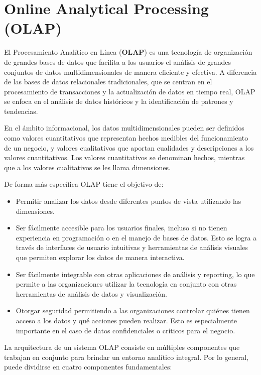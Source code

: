 \section{Online Analytical Processing (OLAP)} \label{section:olap}

El Procesamiento Anal\'itico en L\'inea (\textbf{OLAP}) es una tecnología de organización de grandes bases de datos 
que facilita a los usuarios el an\'alisis de grandes conjuntos de datos multidimensionales de manera 
eficiente y efectiva. A diferencia de las bases de datos relacionales tradicionales, que se centran en el procesamiento 
de transacciones y la actualización de datos en tiempo real, OLAP se enfoca en el análisis de datos históricos y la 
identificación de patrones y tendencias\cite{chaudhuri1997overview}.

En el ámbito informacional, los datos multidimensionales pueden ser definidos como valores cuantitativos que representan hechos medibles del 
funcionamiento de un negocio, y valores cualitativos que aportan cualidades y descripciones a los valores cuantitativos. Los valores cuantitativos 
se denominan hechos, mientras que a los valores cualitativos se les llama dimensiones\cite{lismaster}.

De forma m\'as espec\'ifica OLAP tiene el objetivo de: 

\begin{itemize}
    \item Permitir analizar los datos desde 
        diferentes puntos de vista utilizando las dimensiones.
    \item Ser fácilmente accesible para los usuarios finales, incluso si no tienen experiencia en programación o en el 
        manejo de bases de datos. Esto se logra a través de interfaces de usuario intuitivas y herramientas de análisis 
        visuales que permiten explorar los datos de manera interactiva.
    \item Ser f\'acilmente integrable con otras aplicaciones de análisis y reporting, lo que permite a las organizaciones 
        utilizar la tecnología en conjunto con otras herramientas de análisis de datos y visualización.
    \item Otorgar seguridad permitiendo a las organizaciones controlar quiénes tienen acceso a los datos y qué acciones 
        pueden realizar. Esto es especialmente importante en el caso de datos confidenciales o críticos para el negocio.
\end{itemize}

La arquitectura de un sistema OLAP consiste en múltiples componentes que trabajan en conjunto para brindar un entorno 
analítico integral. Por lo general, puede dividirse en cuatro componentes fundamentales\cite{nanda2019comprehensive}:

